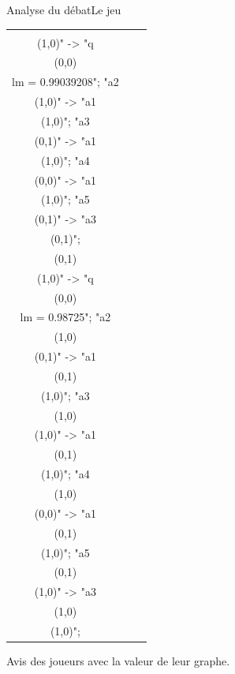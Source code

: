 \documentclass{beamer}
\begin{document}
\begin{frame}{Analyse du débat}{Le jeu}
\begin{center}
\begin{tabular}{ccc}
        \begin{tikzpicture}[>=stealth]
        \graph [ layered layout, nodes = {scale=0.75, align=center} ] {
        "a1\\ (1,0)" -> "q\\ (0,0)\\lm = 0.99039208";
        "a2\\ (1,0)" -> "a1\\ (1,0)";
        "a3\\ (0,1)" -> "a1\\ (1,0)";
        "a4\\ (0,0)" -> "a1\\ (1,0)";
        "a5\\ (0,1)" -> "a3\\ (0,1)";
        };
        \end{tikzpicture} &
        \begin{tikzpicture}[>=stealth]
        \graph [ layered layout, nodes = {scale=0.75, align=center} ] {
        "a1\\ (0,1)\\ (1,0)" -> "q\\ (0,0)\\lm = 0.98725";
        "a2\\ (1,0)\\ (0,1)" -> "a1\\ (0,1)\\ (1,0)";
        "a3\\ (1,0)\\ (1,0)" -> "a1\\ (0,1)\\ (1,0)";
        "a4\\ (1,0)\\ (0,0)" -> "a1\\ (0,1)\\ (1,0)";
        "a5\\ (0,1)\\ (1,0)" -> "a3\\ (1,0)\\ (1,0)";
        };
        \end{tikzpicture}\\
      \end{tabular}
    \end{center}
    Avis des joueurs avec la valeur de leur graphe.
  \end{frame}
\end{document}
